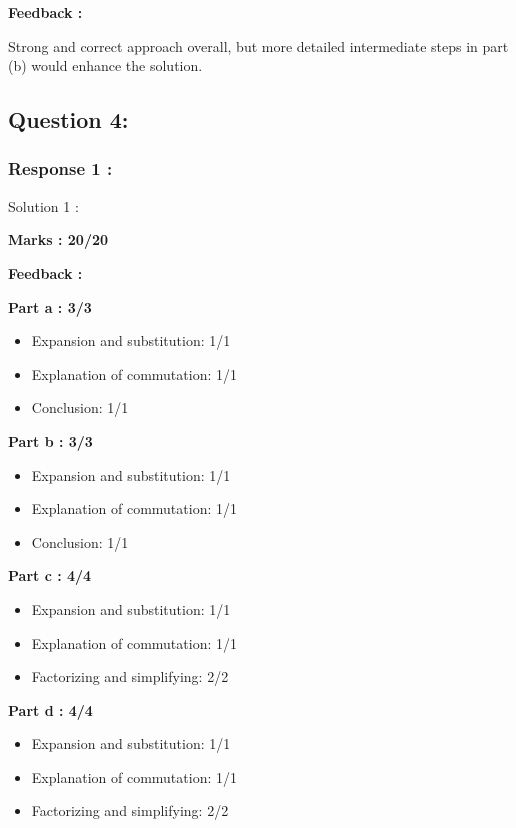 \documentclass[a4paper,11pt]{article}
\begin{document}
\textbf{Feedback :}

Strong and correct approach overall, but more detailed intermediate steps in part (b) would enhance the solution.





\subsection*{Question 4:}


\subsubsection*{Response 1 :}

Solution 1 :

\textbf{Marks : 20/20}

\textbf{Feedback :}

\textbf{Part a : 3/3}

\begin{itemize}
    \item Expansion and substitution: 1/1
    \item Explanation of commutation: 1/1
    \item Conclusion: 1/1
\end{itemize}


\textbf{Part b : 3/3}

\begin{itemize}
    \item Expansion and substitution: 1/1
    \item Explanation of commutation: 1/1
    \item Conclusion: 1/1
\end{itemize}


\textbf{Part c : 4/4}

\begin{itemize}
    \item Expansion and substitution: 1/1
    \item Explanation of commutation: 1/1
    \item Factorizing and simplifying: 2/2
\end{itemize}


\textbf{Part d : 4/4}

\begin{itemize}
    \item Expansion and substitution: 1/1
    \item Explanation of commutation: 1/1
    \item Factorizing and simplifying: 2/2
\end{itemize}
\end{document}
